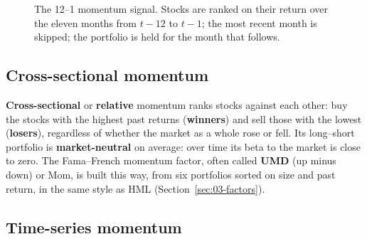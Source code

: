 \begin{figure}[htbp]
\centering
{}
\caption{The 12--1 momentum signal. Stocks are ranked on their return over the eleven months from $t-12$ to $t-1$; the most recent month is skipped; the portfolio is held for the month that follows.}
\label{fig:06-signal}
\end{figure}

\subsection{Cross-sectional momentum}

\textbf{Cross-sectional} or \textbf{relative} momentum ranks stocks against each other: buy the stocks with the highest past returns (\textbf{winners}) and sell those with the lowest (\textbf{losers}), regardless of whether the market as a whole rose or fell. Its long--short portfolio is \textbf{market-neutral} on average: over time its beta to the market is close to zero. The Fama--French momentum factor, often called \textbf{UMD} (up minus down) or Mom, is built this way, from six portfolios sorted on size and past return, in the same style as HML (Section~\ref{sec:03-factors}).

\subsection{Time-series momentum}

